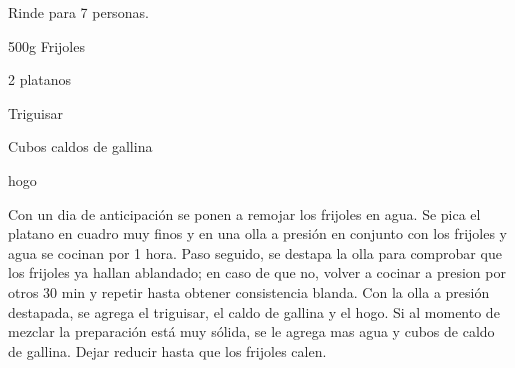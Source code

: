 
Rinde para 7 personas.

\begin{ingredientes}
\item 500g Frijoles
\item 2 platanos
\item Triguisar
\item Cubos caldos de gallina
\item hogo
\end{ingredientes}
\preparacion
Con un dia de anticipación se ponen a remojar los frijoles en agua. Se pica el platano en cuadro muy finos y en una olla a presión en conjunto con los frijoles y agua se cocinan por 1 hora. Paso seguido, se destapa la olla para comprobar que los frijoles ya hallan ablandado; en caso de que no, volver a cocinar a presion por otros 30 min y repetir hasta obtener consistencia blanda. Con la olla a presión destapada, se agrega el triguisar, el caldo de gallina y el hogo. Si al momento de mezclar la preparación está muy sólida, se le agrega mas agua y cubos de caldo de gallina. Dejar reducir hasta que los frijoles calen.